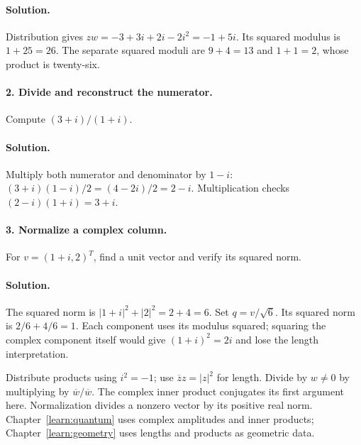 \paragraph{Solution.}
Distribution gives $zw=-3+3i+2i-2i^2=-1+5i$.
Its squared modulus is $1+25=26$. The separate squared moduli are
$9+4=13$ and $1+1=2$, whose product is twenty-six.

\paragraph{2. Divide and reconstruct the numerator.}
Compute $(3+i)/(1+i)$.
\paragraph{Solution.}
Multiply both numerator and denominator by $1-i$:
$(3+i)(1-i)/2=(4-2i)/2=2-i$.
Multiplication checks $(2-i)(1+i)=3+i$.

\paragraph{3. Normalize a complex column.}
For $v=(1+i,2)^T$, find a unit vector and verify its squared norm.
\paragraph{Solution.}
The squared norm is $|1+i|^2+|2|^2=2+4=6$.
Set $q=v/\sqrt6$. Its squared norm is $2/6+4/6=1$.
Each component uses its modulus squared; squaring the complex component
itself would give $(1+i)^2=2i$ and lose the length interpretation.


\lessonreference
{Distribute products using $i^2=-1$; use $\overline z z=|z|^2$ for
length. Divide by $w\ne0$ by multiplying by $\overline w/\overline w$.}
{The complex inner product conjugates its first argument here.
Normalization divides a nonzero vector by its positive real norm.}
{Chapter~\ref{learn:quantum} uses complex amplitudes and inner products;
Chapter~\ref{learn:geometry} uses lengths and products as geometric data.}

